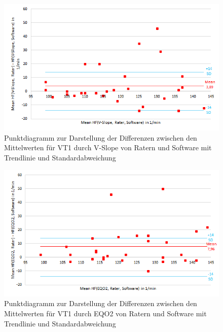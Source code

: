 %
\begin{figure}[H]
	\centering
	\includegraphics[scale=0.7]{Bilder/mean_vslope}
	\caption[Punktdiagramm mit Differenzen für V-Slope]{Punktdiagramm zur Darstellung der Differenzen zwischen den Mittelwerten für VT1 durch V-Slope von Ratern und Software mit Trendlinie und Standardabweichung}
	\label{pic:pic23}
\end{figure}
%
\begin{figure}[H]
	\centering
	\includegraphics[scale=0.7]{Bilder/mean_eqo2}
	\caption[Punktdiagramm mit Differenzen für \acs{EQO2}]{Punktdiagramm zur Darstellung der Differenzen zwischen den Mittelwerten für VT1 durch \acs{EQO2} von Ratern und Software mit Trendlinie und Standardabweichung}
	\label{pic:pic24}
\end{figure}

